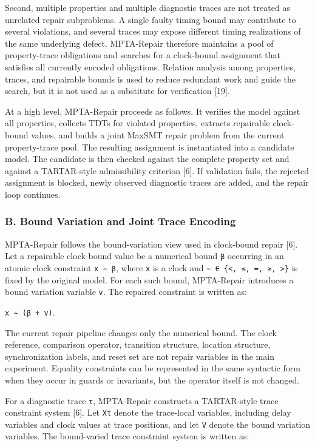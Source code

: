 \documentclass[
]{article}
\begin{document}
Second, multiple properties and multiple diagnostic traces are not
treated as unrelated repair subproblems. A single faulty timing bound
may contribute to several violations, and several traces may expose
different timing realizations of the same underlying defect. MPTA-Repair
therefore maintains a pool of property-trace obligations and searches
for a clock-bound assignment that satisfies all currently encoded
obligations. Relation analysis among properties, traces, and repairable
bounds is used to reduce redundant work and guide the search, but it is
not used as a substitute for verification {[}19{]}.

At a high level, MPTA-Repair proceeds as follows. It verifies the model
against all properties, collects TDTs for violated properties, extracts
repairable clock-bound values, and builds a joint MaxSMT repair problem
from the current property-trace pool. The resulting assignment is
instantiated into a candidate model. The candidate is then checked
against the complete property set and against a TARTAR-style
admissibility criterion {[}6{]}. If validation fails, the rejected
assignment is blocked, newly observed diagnostic traces are added, and
the repair loop continues.

\subsubsection{B. Bound Variation and Joint Trace
Encoding}\label{b.-bound-variation-and-joint-trace-encoding}

MPTA-Repair follows the bound-variation view used in clock-bound repair
{[}6{]}. Let a repairable clock-bound value be a numerical bound
\texttt{β} occurring in an atomic clock constraint \texttt{x\ ∼\ β},
where \texttt{x} is a clock and
\texttt{∼\ ∈\ \{\textless{},\ ≤,\ =,\ ≥,\ \textgreater{}\}} is fixed by
the original model. For each such bound, MPTA-Repair introduces a bound
variation variable \texttt{v}. The repaired constraint is written as:

\texttt{x\ ∼\ (β\ +\ v)}.

The current repair pipeline changes only the numerical bound. The clock
reference, comparison operator, transition structure, location
structure, synchronization labels, and reset set are not repair
variables in the main experiment. Equality constraints can be
represented in the same syntactic form when they occur in guards or
invariants, but the operator itself is not changed.

For a diagnostic trace \texttt{τ}, MPTA-Repair constructs a TARTAR-style
trace constraint system {[}6{]}. Let \texttt{Xτ} denote the trace-local
variables, including delay variables and clock values at trace
positions, and let \texttt{V} denote the bound variation variables. The
bound-varied trace constraint system is written as:
\end{document}
